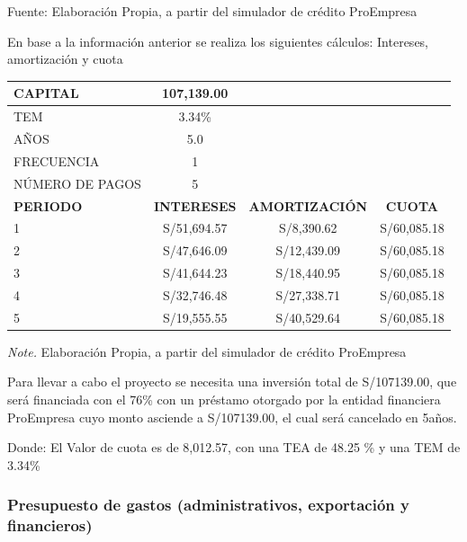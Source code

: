 \documentclass[
  stu,
  floatsintext,
  longtable,
  a4paper,
  nolmodern,
  notxfonts,
  notimes,
  colorlinks=true,linkcolor=blue,citecolor=blue,urlcolor=blue]{apa7}
\begin{document}
Fuente: Elaboración Propia, a partir del simulador de crédito ProEmpresa

En base a la información anterior se realiza los siguientes cálculos:
Intereses, amortización y cuota

\begin{table}

{\caption{{Tabla de Amortizaciones}{\label{tbl-mytable2}}}}

\begin{longtable}[]{@{}lccc@{}}
\toprule\noalign{}
CAPITAL & 107,139.00 & & \\
\midrule\noalign{}
\endhead
\bottomrule\noalign{}
\endlastfoot
TEM & 3.34\% & & \\
AÑOS & 5.0 & & \\
FRECUENCIA & 1 & & \\
NÚMERO DE PAGOS & 5 & & \\
\textbf{PERIODO} & \textbf{INTERESES} & \textbf{AMORTIZACIÓN} &
\textbf{CUOTA} \\
1 & S/51,694.57 & S/8,390.62 & S/60,085.18 \\
2 & S/47,646.09 & S/12,439.09 & S/60,085.18 \\
3 & S/41,644.23 & S/18,440.95 & S/60,085.18 \\
4 & S/32,746.48 & S/27,338.71 & S/60,085.18 \\
5 & S/19,555.55 & S/40,529.64 & S/60,085.18 \\
\end{longtable}

{\noindent \emph{Note.} Elaboración Propia, a partir del simulador de crédito ProEmpresa}

\end{table}

Para llevar a cabo el proyecto se necesita una inversión total de
S/107139.00, que será financiada con el 76\% con un préstamo otorgado
por la entidad financiera ProEmpresa cuyo monto asciende a S/107139.00,
el cual será cancelado en 5años.

Donde: El Valor de cuota es de 8,012.57, con una TEA de 48.25 \% y una
TEM de 3.34\%

\subsubsection{Presupuesto de gastos (administrativos, exportación y
financieros)}\label{presupuesto-de-gastos-administrativos-exportaciuxf3n-y-financieros}
\end{document}
